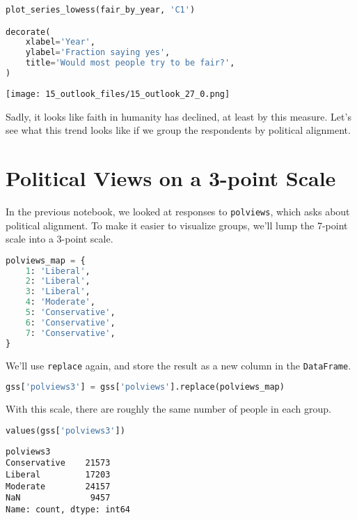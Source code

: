 \begin{lstlisting}[language=Python,style=source]
plot_series_lowess(fair_by_year, 'C1')

decorate(
    xlabel='Year',
    ylabel='Fraction saying yes',
    title='Would most people try to be fair?',
)
\end{lstlisting}

\begin{center}
\texttt{[image: 15\_outlook\_files/15\_outlook\_27\_0.png]}
\end{center}

Sadly, it looks like faith in humanity has declined, at least by this
measure. Let's see what this trend looks like if we group the
respondents by political alignment.

\section{Political Views on a 3-point
Scale}\label{political-views-on-a-3-point-scale}

In the previous notebook, we looked at responses to
\passthrough{\lstinline!polviews!}, which asks about political
alignment. To make it easier to visualize groups, we'll lump the 7-point
scale into a 3-point scale.


\begin{lstlisting}[language=Python,style=source]
polviews_map = {
    1: 'Liberal',
    2: 'Liberal',
    3: 'Liberal',
    4: 'Moderate',
    5: 'Conservative',
    6: 'Conservative',
    7: 'Conservative',
}
\end{lstlisting}

We'll use \passthrough{\lstinline!replace!} again, and store the result
as a new column in the \passthrough{\lstinline!DataFrame!}.

\begin{lstlisting}[language=Python,style=source]
gss['polviews3'] = gss['polviews'].replace(polviews_map)
\end{lstlisting}

\pagebreak

With this scale, there are roughly the same number of people in each
group.

\begin{lstlisting}[language=Python,style=source]
values(gss['polviews3'])
\end{lstlisting}

\begin{lstlisting}[style=output]
polviews3
Conservative    21573
Liberal         17203
Moderate        24157
NaN              9457
Name: count, dtype: int64
\end{lstlisting}

